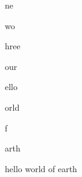 \newtoks\tmptoks
\newtoks\mytoks
\def\prepend#1\par{%
        \mytoks\expandafter{\the\expandafter\tmptoks\the\mytoks}%
}
\def\tac#1{%
        \mytoks{\relax}
        \everypar{\prepend}
        \obeylines
        #1
}

\prepend one\par
\prepend two\par
\prepend three\par
\prepend four\par
\the\mytoks

\bye %

\mytoks{\relax}
\obeylines

\prepend hello
\prepend world
\prepend of
\prepend earth

\tac{
hello
world
of
earth
}

